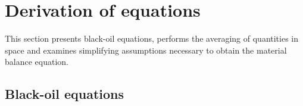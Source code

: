 \documentclass[final,authoryear,5p,twocolumn,10pt]{elsarticle}
\begin{document}
%
%
%
%
%

\section{Derivation of equations}

This section presents black-oil equations, performs the averaging of quantities in space and examines simplifying assumptions necessary to obtain the material balance equation.

\subsection{Black-oil equations}


\end{document}
